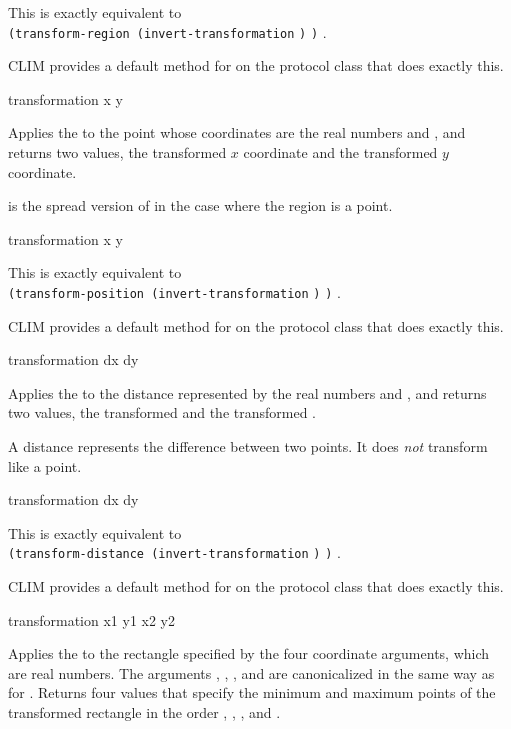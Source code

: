 This is exactly equivalent to \\
\verb+(transform-region (invert-transformation+ \verb+)+
\verb+)+ .

CLIM provides a default method for  on the
 protocol class that does exactly this.


 {transformation x y}

Applies the   to the point whose
coordinates are the real numbers  and , and returns two values,
the transformed $x$ coordinate and the transformed $y$ coordinate.

 is the spread version of  in the
case where the region is a point.

 {transformation x y}

This is exactly equivalent to \\
\verb+(transform-position (invert-transformation+ \verb+)+
 \verb+)+ .

CLIM provides a default method for  on the
 protocol class that does exactly this.


 {transformation dx dy}

Applies the   to the distance
represented by the real numbers  and , and returns two values,
the transformed  and the transformed .

A distance represents the difference between two points.  It does {\sl not}
transform like a point.

 {transformation dx dy} 

This is exactly equivalent to \\
\verb+(transform-distance (invert-transformation+ \verb+)+
 \verb+)+ .

CLIM provides a default method for  on the
 protocol class that does exactly this.


 {transformation x1 y1 x2 y2}

Applies the   to the rectangle
specified by the four coordinate arguments, which are real numbers.  The
arguments , , , and  are canonicalized in the
same way as for .  Returns four values that specify
the minimum and maximum points of the transformed rectangle in the order
, , , and .

